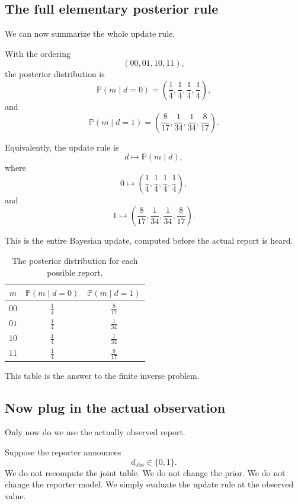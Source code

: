 \documentclass[11pt]{article}
\newcommand{\dobs}{d_{\mathrm{obs}}}
\begin{document}
\subsection{The full elementary posterior rule}

We can now summarize the whole update rule.

With the ordering
\[
    (00,01,10,11),
\]
the posterior distribution is
\[
    \mathbb{P}(m\mid d=0)
    =
    \left(
        \frac{1}{4},
        \frac{1}{4},
        \frac{1}{4},
        \frac{1}{4}
    \right),
\]
and
\[
    \mathbb{P}(m\mid d=1)
    =
    \left(
        \frac{8}{17},
        \frac{1}{34},
        \frac{1}{34},
        \frac{8}{17}
    \right).
\]

Equivalently, the update rule is
\[
    d
    \longmapsto
    \mathbb{P}(m\mid d),
\]
where
\[
    0
    \longmapsto
    \left(
        \frac{1}{4},
        \frac{1}{4},
        \frac{1}{4},
        \frac{1}{4}
    \right),
\]
and
\[
    1
    \longmapsto
    \left(
        \frac{8}{17},
        \frac{1}{34},
        \frac{1}{34},
        \frac{8}{17}
    \right).
\]

This is the entire Bayesian update, computed before the actual report is heard.

\begin{table}[h]
\centering
\begin{tabular}{c c c}
\toprule
\(m\) & \(\mathbb{P}(m\mid d=0)\) & \(\mathbb{P}(m\mid d=1)\) \\
\midrule
\(00\) & \(\frac{1}{4}\) & \(\frac{8}{17}\) \\
\(01\) & \(\frac{1}{4}\) & \(\frac{1}{34}\) \\
\(10\) & \(\frac{1}{4}\) & \(\frac{1}{34}\) \\
\(11\) & \(\frac{1}{4}\) & \(\frac{8}{17}\) \\
\bottomrule
\end{tabular}
\caption{The posterior distribution for each possible report.}
\label{tab:elementary-posterior-rule}
\end{table}

This table is the answer to the finite inverse problem.

\subsection{Now plug in the actual observation}

Only now do we use the actually observed report.

Suppose the reporter announces
\[
    \dobs\in\{0,1\}.
\]
We do not recompute the joint table. We do not change the prior. We do not change the reporter model. We simply evaluate the update rule at the observed value.
\end{document}
